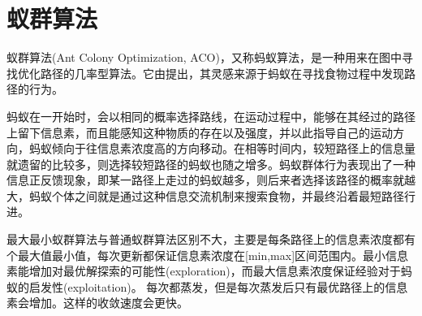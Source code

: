 \documentclass[lang=cn,11pt]{elegantpaper}
\begin{document}
\section{蚁群算法}
蚁群算法(Ant Colony Optimization, ACO)，又称蚂蚁算法，是一种用来在图中寻找优化路径的几率型算法。它由\cite{dorigo1999ant}提出，其灵感来源于蚂蚁在寻找食物过程中发现路径的行为。

蚂蚁在一开始时，会以相同的概率选择路线，在运动过程中，能够在其经过的路径上留下信息素，而且能感知这种物质的存在以及强度，并以此指导自己的运动方向，蚂蚁倾向于往信息素浓度高的方向移动。在相等时间内，较短路径上的信息量就遗留的比较多，则选择较短路径的蚂蚁也随之增多。蚂蚁群体行为表现出了一种信息正反馈现象，即某一路径上走过的蚂蚁越多，则后来者选择该路径的概率就越大，蚂蚁个体之间就是通过这种信息交流机制来搜索食物，并最终沿着最短路径行进。


最大最小蚁群算法与普通蚁群算法区别不大，主要是每条路径上的信息素浓度都有个最大值最小值，每次更新都保证信息素浓度在[min,max]区间范围内。最小信息素能增加对最优解探索的可能性(exploration)，而最大信息素浓度保证经验对于蚂蚁的启发性(exploitation)。
每次都蒸发，但是每次蒸发后只有最优路径上的信息素会增加。这样的收敛速度会更快。
\end{document}
